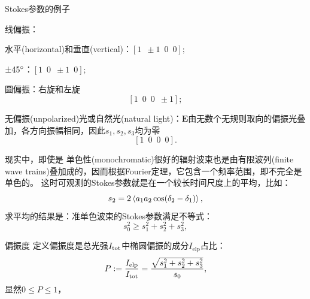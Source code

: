\begin{example}{Stokes参数的例子}{}
    \begin{compactitem}
    	\item 线偏振：
        \begin{compactitem}
            \item 水平(horizontal)和垂直(vertical)：$[1\enspace\pm 1\enspace0\enspace0];$
            \item $\pm 45^\circ$：$[1\enspace0\enspace\pm 1\enspace0];$
        \end{compactitem}
    	\item 圆偏振：右旋和左旋
    	\[
            [1\enspace0\enspace0\enspace\pm 1];
        \]
    	\item 无偏振(unpolarized)光或自然光(natural light)：$\bm E$由无数个无规则取向的偏振光叠加，各方向振幅相同，因此$s_1,s_2,s_3$均为零
        \[
            [1\enspace0\enspace0\enspace0].
        \]
    \end{compactitem}
\end{example}

\begin{remark}
    现实中，即使是%
    单色性(monochromatic)很好的辐射波束也是由有限波列(finite wave trains)叠加成的，因而根据Fourier定理，它包含一个频率范围，即不完全是单色的。%
    这时可观测的Stokes参数就是在一个较长时间尺度上的平均，比如：
    \[
        s_2=2\left\langle a_1a_2\cos(\mathop{}\!\delta_2-\mathop{}\!\delta_1)\right\rangle,
    \]
    求平均的结果是：准单色波束的Stokes参数满足不等式：
    \[
        s_0^2\geqslant s_1^2+s_2^2+s_3^2,
    \]
\end{remark}

\begin{definition}{偏振度}{}
    定义偏振度是总光强$I_\mathrm{tot}$中椭圆偏振的成分$I_\text{elp}$占比：
    \[
        P:=\frac{I_\text{elp}}{I_\mathrm{tot}}=\frac{\sqrt{s_1^2+s_2^2+s_3^2}}{s_0},
    \]
    显然$0\leqslant P\leqslant 1$，
\end{definition}

